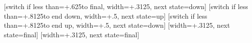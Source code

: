 {
  [switch if less than=+.625\pgfdecorationsegmentlength to final,
                  width=+.3125\pgfdecorationsegmentlength,
                  next state=down]
  { 
    \pgfpathcurveto
    {\pgfqpoint{.125\pgfdecorationsegmentlength}{0pt}}
    {\pgfqpoint{.1875\pgfdecorationsegmentlength}{\pgfdecorationsegmentamplitude}}
    {\pgfqpoint{.3125\pgfdecorationsegmentlength}{\pgfdecorationsegmentamplitude}}
  }
  [switch if less than=+.8125\pgfdecorationsegmentlength to end down,
               width=+.5\pgfdecorationsegmentlength,
               next state=up]
  {
    \pgfpathcosine{\pgfqpoint{.25\pgfdecorationsegmentlength}{-1\pgfdecorationsegmentamplitude}}
    \pgfpathsine{\pgfqpoint{.25\pgfdecorationsegmentlength}{-1\pgfdecorationsegmentamplitude}}
  }               
  [switch if less than=+.8125\pgfdecorationsegmentlength to end up,
             width=+.5\pgfdecorationsegmentlength,
             next state=down]
  {
    \pgfpathcosine{\pgfqpoint{.25\pgfdecorationsegmentlength}{\pgfdecorationsegmentamplitude}}
    \pgfpathsine{\pgfqpoint{.25\pgfdecorationsegmentlength}{\pgfdecorationsegmentamplitude}}
  }               
  [width=+.3125\pgfdecorationsegmentlength,
                   next state=final]
  {
    \pgfpathcurveto
    {\pgfqpoint{.125\pgfdecorationsegmentlength}{\pgfdecorationsegmentamplitude}}
    {\pgfqpoint{.1875\pgfdecorationsegmentlength}{0pt}}
    {\pgfqpoint{.3125\pgfdecorationsegmentlength}{0pt}}
  }  
  [width=+.3125\pgfdecorationsegmentlength,
                 next state=final]
  {
    \pgfpathcurveto
    {\pgfqpoint{.125\pgfdecorationsegmentlength}{-\pgfdecorationsegmentamplitude}}
    {\pgfqpoint{.1875\pgfdecorationsegmentlength}{0pt}}
    {\pgfqpoint{.3125\pgfdecorationsegmentlength}{0pt}}
  }  
  {
    \pgfpathlineto{\pgfpointdecoratedpathlast}
  }
}


%


